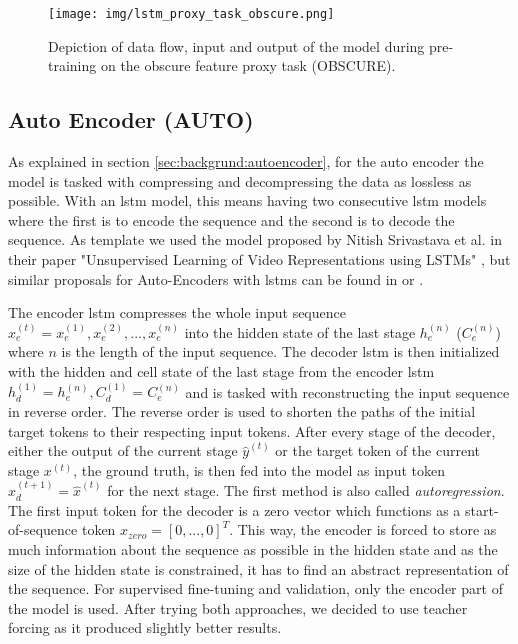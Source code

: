 \begin{figure}[h]
	\centering
	\texttt{[image: img/lstm\_proxy\_task\_obscure.png]}
	\caption{Depiction of data flow, input and output of the model during pre-training on the obscure feature proxy task (OBSCURE).}
	\label{fig:experiments:lstm_proxy_task_obscure}
\end{figure}

\subsection{Auto Encoder (AUTO)} \label{sec:experiments:lstm:auto_encoder}

As explained in section \ref{sec:backgrund:autoencoder}, for the auto encoder the model is tasked with compressing and decompressing the data as lossless as possible. With an \gls{lstm} model, this means having two consecutive \gls{lstm} models where the first is to encode the sequence and the second is to decode the sequence. As template we used the model proposed by Nitish Srivastava et al. in their paper "Unsupervised Learning of Video Representations using LSTMs" \cite{unsupervised_learning_lstms}, but similar proposals for Auto-Encoders with \glspl{lstm} can be found in \cite{unsupervised_learning_lstms_timeseries} or \cite{lstm_anomaly_detection}. \par
The encoder \gls{lstm} compresses the whole input sequence $x_e^{(t)} = x_e^{(1)}, x_e^{(2)}, ..., x_e^{(n)}$ into the hidden state of the last stage $h_e^{(n)}$ ($C_e^{(n)}$) where $n$ is the length of the input sequence. The decoder \gls{lstm} is then initialized with the hidden and cell state of the last stage from the encoder \gls{lstm} $h_d^{(1)} = h_e^{(n)}, C_d^{(1)} = C_e^{(n)}$ and is tasked with reconstructing the input sequence in reverse order. The reverse order is used to shorten the paths of the initial target tokens to their respecting input tokens. After every stage of the decoder, either the output of the current stage $\hat{y}^{(t)}$ or the target token of the current stage $x^{(t)}$, the ground truth, is then fed into the model as input token $x_d^{(t+1)} = \hat{x}^{(t)}$ for the next stage. The first method is also called \textit{autoregression}. The first input token for the decoder is a zero vector which functions as a start-of-sequence token $x_{zero} = [0, ..., 0]^T$. This way, the encoder is forced to store as much information about the sequence as possible in the hidden state and as the size of the hidden state is constrained, it has to find an abstract representation of the sequence. For supervised fine-tuning and validation, only the encoder part of the model is used. After trying both approaches, we decided to use teacher forcing as it produced slightly better results.

